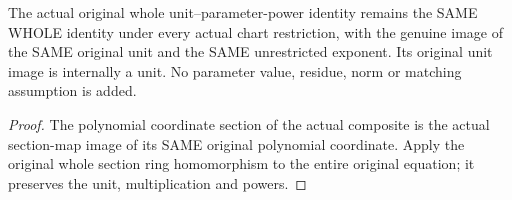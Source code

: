 \begin{lemma}\label{lem:actual-common-affine-whole-unit-parameter-restriction}
\leanok
{}
The actual original whole unit--parameter-power identity remains the SAME WHOLE identity under every actual chart restriction, with the genuine image of the SAME original unit and the SAME unrestricted exponent. Its original unit image is internally a unit. No parameter value, residue, norm or matching assumption is added.
\end{lemma}
\begin{proof}
The polynomial coordinate section of the actual composite is the actual section-map image of its SAME original polynomial coordinate. Apply the original whole section ring homomorphism to the entire original equation; it preserves the unit, multiplication and powers.
\end{proof}
